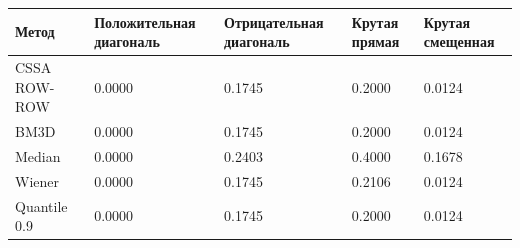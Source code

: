 \begin{tabular}{|l|l|l|l|l|}
\hline
Метод & Положительная диагональ & Отрицательная диагональ & Крутая прямая & Крутая смещенная \\
\hline
CSSA ROW-ROW & 0.0000 & 0.1745 & 0.2000 & 0.0124 \\
\hline
BM3D & 0.0000 & 0.1745 & 0.2000 & 0.0124 \\
\hline
Median & 0.0000 & 0.2403 & 0.4000 & 0.1678 \\
\hline
Wiener & 0.0000 & 0.1745 & 0.2106 & 0.0124 \\
\hline
Quantile 0.9 & 0.0000 & 0.1745 & 0.2000 & 0.0124 \\
\hline
\end{tabular}
